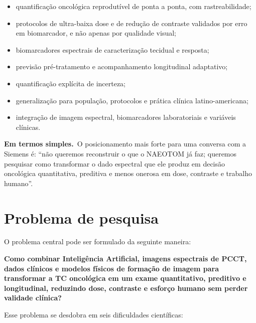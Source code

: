 \documentclass[11pt,a4paper]{article}
\newcommand{\simples}{\textcolor{titleblue}{\textbf{Em termos simples.}}\ }
\begin{document}
\begin{itemize}
\item quantificação oncológica reprodutível de ponta a ponta, com rastreabilidade;
\item protocolos de ultra-baixa dose e de redução de contraste validados por erro em biomarcador, e não apenas por qualidade visual;
\item biomarcadores espectrais de caracterização tecidual e resposta;
\item previsão pré-tratamento e acompanhamento longitudinal adaptativo;
\item quantificação explícita de incerteza;
\item generalização para população, protocolos e prática clínica latino-americana;
\item integração de imagem espectral, biomarcadores laboratoriais e variáveis clínicas.
\end{itemize}

\begin{caixa}
\simples O posicionamento mais forte para uma conversa com a Siemens é: ``não queremos reconstruir o que o NAEOTOM já faz; queremos pesquisar como transformar o dado espectral que ele produz em decisão oncológica quantitativa, preditiva e menos onerosa em dose, contraste e trabalho humano''.
\end{caixa}

\section{Problema de pesquisa}

O problema central pode ser formulado da seguinte maneira:

\begin{caixa}
\textbf{Como combinar Inteligência Artificial, imagens espectrais de PCCT, dados clínicos e modelos físicos de formação de imagem para transformar a TC oncológica em um exame quantitativo, preditivo e longitudinal, reduzindo dose, contraste e esforço humano sem perder validade clínica?}
\end{caixa}

Esse problema se desdobra em seis dificuldades científicas:
\end{document}
